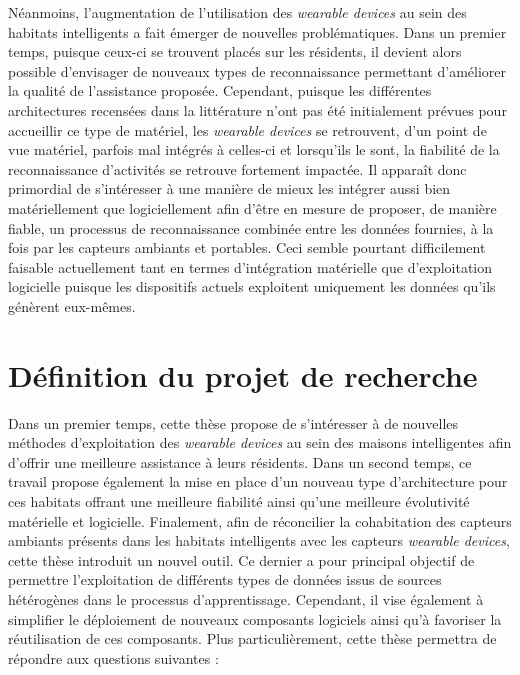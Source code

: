 {{Néanmoins, l'augmentation de l'utilisation des \textit{wearable devices} au sein des habitats intelligents a fait émerger de nouvelles problématiques. Dans un premier temps, puisque ceux-ci se trouvent placés sur les résidents, il devient alors possible d'envisager de nouveaux types de reconnaissance permettant d'améliorer la qualité de l'assistance proposée. Cependant, puisque les différentes architectures recensées dans la littérature n'ont pas été initialement prévues pour accueillir ce type de matériel, les \textit{wearable devices} se retrouvent, d'un point de vue matériel, parfois mal intégrés à celles-ci et lorsqu'ils le sont, la fiabilité de la reconnaissance d'activités se retrouve fortement impactée. Il apparaît donc primordial de s'intéresser à une manière de mieux les intégrer aussi bien matériellement que logiciellement afin d'être en mesure de proposer, de manière fiable, un processus de reconnaissance combinée entre les données fournies, à la fois par les capteurs ambiants et portables. Ceci semble pourtant difficilement faisable actuellement tant en termes d'intégration matérielle que d'exploitation logicielle puisque les dispositifs actuels exploitent uniquement les données qu'ils génèrent eux-mêmes.


\section{Définition du projet de recherche}
\label{sec:def_proj}

Dans un premier temps, cette thèse propose de s'intéresser à de nouvelles méthodes d'exploitation des \textit{wearable devices} au sein des maisons intelligentes afin d'offrir une meilleure assistance à leurs résidents. Dans un second temps, ce travail propose également la mise en place d'un nouveau type d'architecture pour ces habitats offrant une meilleure fiabilité ainsi qu'une meilleure évolutivité matérielle et logicielle. Finalement, afin de réconcilier la cohabitation des capteurs ambiants présents dans les habitats intelligents avec les capteurs \textit{wearable devices}, cette thèse introduit un nouvel outil. Ce dernier a pour principal objectif de permettre l'exploitation de différents types de données issus de sources hétérogènes dans le processus d'apprentissage. Cependant, il vise également à simplifier le déploiement de nouveaux composants logiciels ainsi qu'à favoriser la réutilisation de ces composants. Plus particulièrement, cette thèse permettra de répondre aux questions suivantes :

}}
